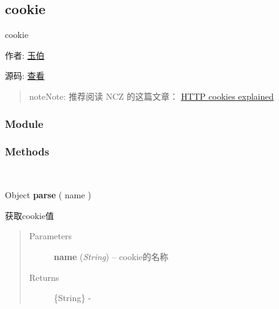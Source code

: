\documentclass[letterpaper,10pt,english]{sphinxmanual}
\begin{document}
\subsection{cookie}
\label{api/core/cookie/index:cookie}\label{api/core/cookie/index::doc}
\begin{DUlineblock}{0em}
\item[] cookie
\item[] 作者: \href{mailto:lifesinger@gmail.com}{玉伯}
\item[] 源码: \href{https://github.com/kissyteam/kissy/tree/master/src/cookie/base.js}{查看}
\end{DUlineblock}
\begin{quote}

\begin{notice}{note}{Note:}
推荐阅读 NCZ 的这篇文章： \href{http://www.nczonline.net/blog/2009/05/05/http-cookies-explained/}{HTTP cookies explained}
\end{notice}
\end{quote}


\subsubsection{Module}
\label{api/core/cookie/index:module}\begin{quote}

{\hyperref[api/core/cookie/index:module-cookie]{}}
\end{quote}


\subsubsection{Methods}
\label{api/core/cookie/index:methods}

\begin{fulllineitems}
\label{api/core/cookie/index:cookie.get}~
\begin{DUlineblock}{0em}
\item[] Object \textbf{parse} ( name )
\item[] 获取cookie值
\end{DUlineblock}
\begin{quote}\begin{description}
\item[{Parameters}] \leavevmode
\textbf{name} (\emph{String}) -- cookie的名称

\item[{Returns}] \leavevmode
\{String\} -

\end{description}\end{quote}

\end{fulllineitems}
\end{document}
